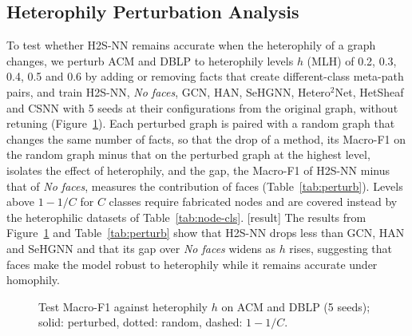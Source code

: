 \documentclass{article}
\newcommand{\method}{\textsc{H2S-NN}}
\newcommand{\res}{{\scriptsize[result]}}
\begin{document}
\subsection{Heterophily Perturbation Analysis}
To test whether \method{} remains accurate when the heterophily of a graph changes, we perturb ACM and DBLP to heterophily levels $h$ (MLH) of 0.2, 0.3, 0.4, 0.5 and 0.6 by adding or removing facts that create different-class meta-path pairs, and train \method{}, \emph{No faces}, GCN, HAN, SeHGNN, Hetero$^2$Net, HetSheaf and CSNN with 5 seeds at their configurations from the original graph, without retuning (Figure~\ref{fig:perturb}). Each perturbed graph is paired with a random graph that changes the same number of facts, so that the drop of a method, its Macro-F1 on the random graph minus that on the perturbed graph at the highest level, isolates the effect of heterophily, and the gap, the Macro-F1 of \method{} minus that of \emph{No faces}, measures the contribution of faces (Table~\ref{tab:perturb}). Levels above $1-1/C$ for $C$ classes require fabricated nodes and are covered instead by the heterophilic datasets of Table~\ref{tab:node-cls}. \res{} The results from Figure~\ref{fig:perturb} and Table~\ref{tab:perturb} show that \method{} drops less than GCN, HAN and SeHGNN and that its gap over \emph{No faces} widens as $h$ rises, suggesting that faces make the model robust to heterophily while it remains accurate under homophily.



\begin{figure}[!htbp]
  \centering
  \caption{Test Macro-F1 against heterophily $h$ on ACM and DBLP (5 seeds); solid: perturbed, dotted: random, dashed: $1-1/C$.}
  \label{fig:perturb}
\end{figure}
\end{document}
